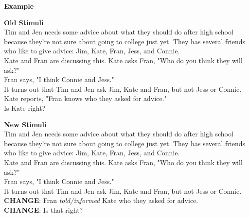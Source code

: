 \bigskip
\large
\noindent \textbf{Example}\\
\normalsize

\begin{exe}
\ex \textbf{Old Stimuli}\\
Tim and Jen needs some advice about what they should do after high school because they're not sure about going to college just yet. They has several friends who like to give advice: Jim, Kate, Fran, Jess, and Connie. \\

Kate and Fran are discussing this. Kate asks Fran, "Who do you think they will ask?" \\

Fran says, "I think Connie and Jess." \\

It turns out that Tim and Jen ask Jim, Kate and Fran, but not Jess or Connie.\\

Kate reports, "Fran knows who they asked for advice." \\

Is Kate right?

\ex \textbf{New Stimuli}\\
Tim and Jen needs some advice about what they should do after high school because they're not sure about going to college just yet. They has several friends who like to give advice: Jim, Kate, Fran, Jess, and Connie. \\

Kate and Fran are discussing this. Kate asks Fran, "Who do you think they will ask?" \\

Fran says, "I think Connie and Jess." \\

It turns out that Tim and Jen ask Jim, Kate and Fran, but not Jess or Connie.\\

\textbf{CHANGE}: Fran \emph{told/informed} Kate who they asked for advice. \\

\textbf{CHANGE}: Is that right?

\end{exe}

